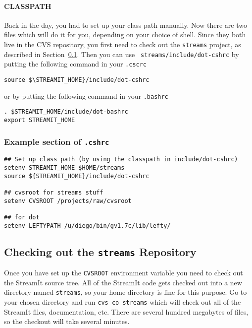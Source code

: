 \paragraph{CLASSPATH}
Back in the day, you had to set up your class path manually.  Now
there are two files which will do it for you, depending on your choice
of shell. Since they both live in the CVS repository, you first need
to check out the {\tt streams} project, as described in
Section~\ref{sec:checkout}. Then you can use {\tt
streams/include/dot-cshrc} by putting the following command in your
{\tt .cscrc}
\begin{verbatim}
source $\STREAMIT_HOME}/include/dot-cshrc
\end{verbatim}

\noindent or by putting the following command in your {\tt .bashrc}

\begin{verbatim}
. $STREAMIT_HOME/include/dot-bashrc
export STREAMIT_HOME
\end{verbatim}

\subsubsection{Example section of {\tt .cshrc}}
\begin{verbatim}
## Set up class path (by using the classpath in include/dot-cshrc)
setenv STREAMIT_HOME $HOME/streams
source ${STREAMIT_HOME}/include/dot-cshrc

## cvsroot for streams stuff
setenv CVSROOT /projects/raw/cvsroot

## for dot
setenv LEFTYPATH /u/diego/bin/gv1.7c/lib/lefty/

\end{verbatim}



\subsection{Checking out the {\tt streams} Repository}
\label{sec:checkout}
Once you have set up the {\tt CVSROOT} environment variable
you need to check out the StreamIt source tree. All of the
StreamIt code gets checked out into a new directory named
{\tt streams}, so your home directory is fine for this purpose.
Go to your chosen directory and run {\tt cvs co streams} which
will check out all of the StreamIt files, documentation, etc.
There are several hundred megabytes of files, so the checkout 
will take several minutes.


